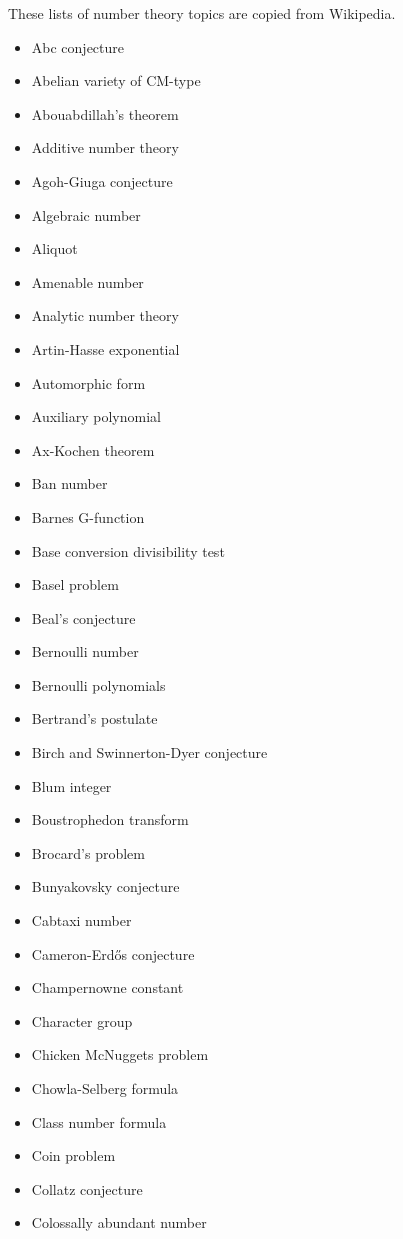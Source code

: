 \documentclass[12pt]{article}
\begin{document}
These lists of number theory topics are copied from Wikipedia.

\begin{itemize}


\item Abc conjecture 
\item Abelian variety of CM-type 
\item Abouabdillah's theorem 
\item Additive number theory 
\item Agoh-Giuga conjecture 
\item Algebraic number 
\item Aliquot 
\item Amenable number 
\item Analytic number theory 
\item Artin-Hasse exponential 
\item Automorphic form 
\item Auxiliary polynomial 
\item Ax-Kochen theorem 
\item Ban number 
\item Barnes G-function 
\item Base conversion divisibility test 
\item Basel problem 
\item Beal's conjecture 
\item Bernoulli number 
\item Bernoulli polynomials 
\item Bertrand's postulate 
\item Birch and Swinnerton-Dyer conjecture 
\item Blum integer 
\item Boustrophedon transform 
\item Brocard's problem 
\item Bunyakovsky conjecture 
\item Cabtaxi number 
\item Cameron-Erd\H{o}s conjecture 
\item Champernowne constant 
\item Character group 
\item Chicken McNuggets problem 
\item Chowla-Selberg formula 
\item Class number formula 
\item Coin problem 
\item Collatz conjecture 
\item Colossally abundant number 

\end{itemize}
\end{document}
